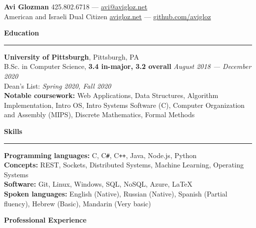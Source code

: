 \documentclass[10pt]{article}
\begin{document}
	\pagestyle{empty}
	\begin{center}
		{\huge \textbf{Avi Glozman}} {\large \hfill 425.802.6718 --- \href{mailto:avi@avigloz.net}{avi@avigloz.net}}\\
		\vspace{1.25mm}
		{\large American and Israeli Dual Citizen \hfill \href{https://avigloz.net}{avigloz.net} --- \href{https://github.com/avigloz}{github.com/avigloz}}
	\end{center}
	
	\begin{flushleft}	
		\vspace{-1.65mm}
		{\large \raggedright \textbf{Education}}
		\vspace{1.25mm}
	
		\hrule
		
		\vspace{2.25mm}
		\textbf{University of Pittsburgh}, Pittsburgh, PA\\
      	{\small B.Sc. in Computer Science, \textbf{3.4 in-major, 3.2 overall} \hfill \textit{August 2018 --- December 2020}}\\
		{\small Dean's List: \textit{Spring 2020, Fall 2020}}\\
		{\small \textbf{Notable coursework:} Web Applications, Data Structures, Algorithm Implementation, Intro OS, Intro Systems Software (C), Computer Organization and Assembly (MIPS), Discrete Mathematics, Formal Methods}
	
		\vspace{1.25mm} 
		{\large \raggedright \textbf{Skills}}
		\vspace{1.25mm}
	
		\hrule
	
		\vspace{2.25mm}
		\textbf{Programming languages:} C, C\verb!#!, C\texttt{++}, Java, Node.js, Python\\
		\vspace{0.5mm}
		\textbf{Concepts:} REST, Sockets, Distributed Systems, Machine Learning, Operating Systems\\
		\vspace{0.5mm}
		\textbf{Software:} Git, Linux, Windows, SQL, NoSQL, Azure, \LaTeX\\ 
		\vspace{0.5mm}
		\textbf{Spoken languages:} English (Native), Russian (Native), Spanish (Partial fluency),  Hebrew (Basic), Mandarin (Very basic)

		\vspace{1.5mm}
		{\large \raggedright \textbf{Professional Experience}}
		\vspace{1.25mm}
	

\end{flushleft}
\end{document}
